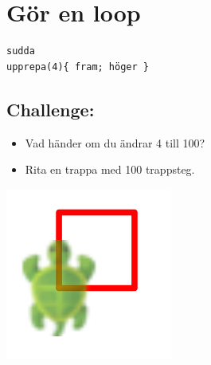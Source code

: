 \chapter{Gör en loop}
\begin{multicols}{2}

\begin{lstlisting}[basicstyle={\ttfamily\fontsize{30}{36}\selectfont},numbers=none]
sudda
upprepa(4){ fram; höger }
\end{lstlisting}
        
\section*{\color{BrickRed}Challenge:}


\begin{itemize}

\item {Vad händer om du ändrar 4 till 100?}
\item {Rita en trappa med 100 trappsteg.}

\end{itemize}



\columnbreak

\begin{center}
\includegraphics{../img/square.png}
\end{center}

\end{multicols}

